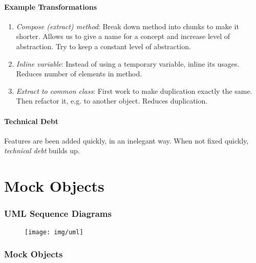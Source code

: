 \documentclass[twocolumn,english]{article}
\begin{document}
\paragraph{Example Transformations}
\begin{enumerate}
\item \emph{Compose (extract) method}: Break down method into chunks to
make it shorter. Allows us to give a name for a concept and increase
level of abstraction. Try to keep a constant level of abstraction.
\item \emph{Inline variable}: Instead of using a temporary variable, inline
its usages. Reduces number of elements in method.
\item \emph{Extract to common class}: First work to make duplication exactly
the same. Then refactor it, e.g. to another object. Reduces duplication.
\end{enumerate}

\paragraph{Technical Debt}

Features are been added quickly, in an inelegant way. When not fixed
quickly, \emph{technical debt} builds up.

\section{Mock Objects}

\subsubsection*{UML Sequence Diagrams}

\begin{figure}[H]
\centering{}\texttt{[image: img/uml]}
\end{figure}

\subsubsection*{Mock Objects}
\end{document}
